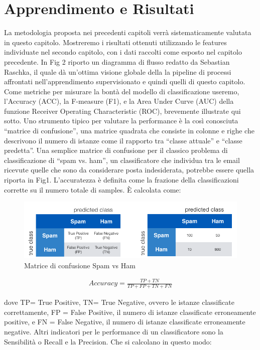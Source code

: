 \chapter{Apprendimento e Risultati}
\label{cap4}
\setcounter{figure}{0}

La metodologia proposta nei precedenti capitoli verrà sistematicamente valutata in questo capitolo. Mostreremo i risultati ottenuti utilizzando le features individuate nel secondo capitolo, con i dati raccolti come esposto nel capitolo precedente. In Fig 2 riporto un diagramma di flusso redatto da Sebastian Raschka, il quale dà un'ottima visione globale della la pipeline di processi affrontati nell'apprendimento supervisionato e quindi quelli di questo capitolo. Come metriche per misurare la bontà del modello di classificazione useremo, l'Accuracy (ACC), la F-measure (F1), e la Area Under Curve (AUC) della funzione Receiver Operating Characteristic (ROC), brevemente illustrate qui sotto.
Uno strumento tipico per valutare la performance è la così conosciuta “matrice di confusione”, una matrice quadrata che consiste in colonne e righe che descrivono il numero di istanze come il rapporto tra “classe attuale” e “classe predetta”. Una semplice matrice di confusione per il classico problema di classificazione di “spam vs. ham”, un classificatore che individua tra le email ricevute quelle che sono da considerare posta indesiderata, potrebbe essere quella riporta in Fig1. \newline L'accuratezza è definita come la frazione della classificazioni corrette su il numero totale di samples. È calcolata come:


\begin{figure}[bp!]
\centering
\includegraphics[width=130mm]{chapters/plots/confusion_matrix.png}
\caption{Matrice di confusione Spam vs Ham \label{overflow}}
\end{figure}

\begin{gather*}
	Accuracy = \frac{TP + TN}{TP + FP + TN + FN }
\end{gather*}

dove TP= True Positive, TN= True Negative, ovvero le istanze classificate correttamente, FP = False Positive, il numero di istanze classificate erroneamente positive, e FN = False Negative, il numero di istanze classificate erroneamente negative. Altri indicatori per le performance di un classificatore sono la Sensibilità o Recall e la Precision. Che si calcolano in questo modo:

